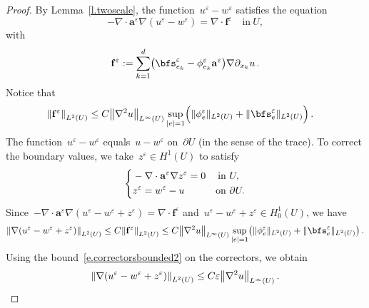\documentclass[11pt,twoside]{article} %
\numberwithin{equation}{section}
\theoremstyle{definition}
\let\originalleft\left
\let\originalright\right
\renewcommand{\left}{\mathopen{}\mathclose\bgroup\originalleft}
\renewcommand{\right}{\aftergroup\egroup\originalright}
\newcommand{\eps}{\varepsilon}
\newcommand{\f}{\mathbf{f}}
\newcommand{\ep}{\eps}
\renewcommand{\a}{\mathbf{a}}
\begin{document}
\begin{proof}
By Lemma~\ref{l.twoscale}, the function~$u^\ep - w^\ep$ satisfies the equation
\begin{equation}
\label{e.uepwep}
-\nabla \cdot \a^\ep \nabla (u^\ep - w^\ep) = \nabla \cdot \f^\ep \quad \mbox{in} \ U,
\end{equation}
with
\begin{equation}
\label{e.def.fep}
\f^\ep := \sum_{k=1}^d 
\left(
\bfs_{e_k}^\ep 
-
\phi_{e_k}^\ep \a^\ep 
\right)
\nabla \partial_{x_k} u 
\,.
\end{equation}
Notice that 
\begin{align}
\label{e.beforecorrectors}
\left\| \f^\ep \right\|_{{L}^2(U)} 
& 
\leq 
C \left\| \nabla^2 u \right\|_{L^\infty(U)} 
\sup_{|e| =1} \Bigl( \| \phi^\ep_e \|_{L^2(U)} + \| \bfs_e^\ep \|_{L^2(U)} \Bigr)
\,.
\end{align}
%
The function~$u^\ep - w^\ep$ equals~$u-w^\ep$ on~$\partial U$ (in the sense of the trace). To correct the boundary values, we take~$z^\ep\in H^1(U)$ to satisfy 
\begin{equation*}
\left\{
\begin{aligned}
& -\nabla \cdot \a^\ep \nabla z^\ep = 0 & \mbox{in} & \ U,  \\
& z^\ep = w^\ep - u & \mbox{on} & \ \partial U. 
\end{aligned}
\right.
\end{equation*}
Since~$-\nabla \cdot \a^\ep  \nabla (u^\ep - w^\ep + z^\ep) = \nabla \cdot\f^\ep$ and~$u^\ep - w^\ep + z^\ep\in H^1_0(U)$, we have
\begin{equation}
\label{e.uepwepzep.0}
\left\| \nabla (u^\ep - w^\ep + z^\ep) \right\|_{L^2(U)} 
\leq
C \left\| \f^\ep \right\|_{L^2(U)} 
\leq
C \left\| \nabla^2 u \right\|_{L^\infty(U)} 
\sup_{|e| =1} \bigl( \| \phi^\ep_e \|_{L^2(U)} + \| \bfs_e^\ep \|_{L^2(U)} \bigr)
\,.
\end{equation}
Using the bound~\eqref{e.correctorsbounded2} on the correctors, we obtain
\begin{equation}
\label{e.uepwepzep}
\left\| \nabla (u^\ep - w^\ep + z^\ep) \right\|_{L^2(U)} 
\leq
C \ep \left\| \nabla^2 u \right\|_{L^\infty(U)} 
\,.

\end{equation}
\end{proof}
\end{document}
